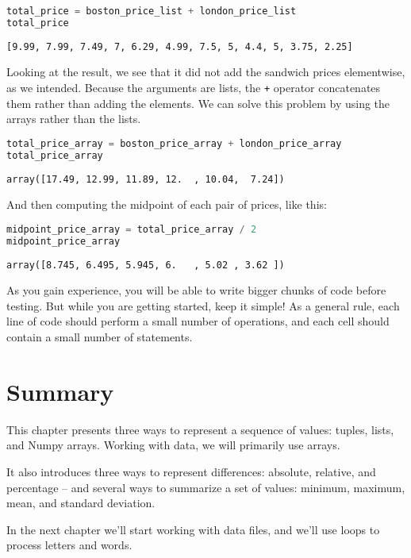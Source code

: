 \documentclass[
]{book}
\newcommand{\passthrough}[1]{#1}
\begin{document}
\begin{lstlisting}[language=Python]
total_price = boston_price_list + london_price_list
total_price
\end{lstlisting}

\begin{lstlisting}
[9.99, 7.99, 7.49, 7, 6.29, 4.99, 7.5, 5, 4.4, 5, 3.75, 2.25]
\end{lstlisting}

Looking at the result, we see that it did not add the sandwich prices
elementwise, as we intended. Because the arguments are lists, the
\passthrough{\lstinline!+!} operator concatenates them rather than
adding the elements. We can solve this problem by using the arrays
rather than the lists.

\begin{lstlisting}[language=Python]
total_price_array = boston_price_array + london_price_array
total_price_array
\end{lstlisting}

\begin{lstlisting}
array([17.49, 12.99, 11.89, 12.  , 10.04,  7.24])
\end{lstlisting}

And then computing the midpoint of each pair of prices, like this:

\begin{lstlisting}[language=Python]
midpoint_price_array = total_price_array / 2
midpoint_price_array
\end{lstlisting}

\begin{lstlisting}
array([8.745, 6.495, 5.945, 6.   , 5.02 , 3.62 ])
\end{lstlisting}

As you gain experience, you will be able to write bigger chunks of code
before testing. But while you are getting started, keep it simple! As a
general rule, each line of code should perform a small number of
operations, and each cell should contain a small number of statements.

\section{Summary}\label{summary}

This chapter presents three ways to represent a sequence of values:
tuples, lists, and Numpy arrays. Working with data, we will primarily
use arrays.

It also introduces three ways to represent differences: absolute,
relative, and percentage -- and several ways to summarize a set of
values: minimum, maximum, mean, and standard deviation.

In the next chapter we'll start working with data files, and we'll use
loops to process letters and words.

\backmatter
\end{document}
